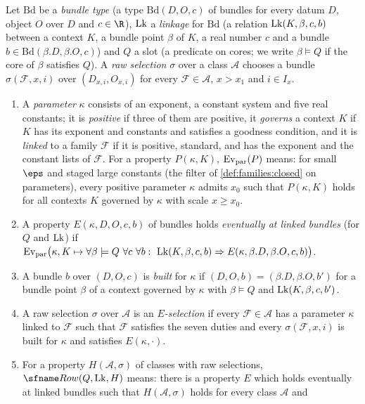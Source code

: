 \begin{definition}[Rows]\label{pf:rows:defrow}
Let $\mathrm{Bd}$ be a \emph{bundle type} (a type $\mathrm{Bd}(D,O,c)$ of bundles for every datum $D$, object $O$ over
$D$ and $c\in\R$), $\mathrm{Lk}$ a \emph{linkage} for $\mathrm{Bd}$ (a relation $\mathrm{Lk}(K,\beta,c,b)$ between a context $K$,
a bundle point $\beta$ of $K$, a real number $c$ and a bundle $b\in\mathrm{Bd}(\beta.D,\beta.O,c)$) and $Q$ a slot
(a predicate on cores; we write $\beta\models Q$ if the core of $\beta$ satisfies $Q$). A \emph{raw selection}
$\sigma$ over a class $\mathcal A$ chooses a bundle $\sigma(\mathcal F,x,i)$ over $(D_{x,i},O_{x,i})$ for every
$\mathcal F\in\mathcal A$, $x>x_1$ and $i\in I_x$.
\begin{enumerate}[label=(\alph*)]
\item A \emph{parameter} $\kappa$ consists of an exponent, a constant system and five real constants; it is
\emph{positive} if three of them are positive, it \emph{governs} a context $K$ if $K$ has its exponent and constants
and satisfies a goodness condition, and it is \emph{linked} to a family $\mathcal F$ if it is positive, standard, and
has the exponent and the constant lists of $\mathcal F$. For a property $P(\kappa,K)$, $\mathrm{Ev}_{\mathrm{par}}(P)$ means: for small
$\eps$ and staged large constants (the filter of \cref{def:families:closed} on parameters), every positive parameter
$\kappa$ admits $x_0$ such that $P(\kappa,K)$ holds for all contexts $K$ governed by $\kappa$ with scale $x\ge x_0$.
\item A property $E(\kappa,D,O,c,b)$ of bundles holds \emph{eventually at linked bundles} (for $Q$ and $\mathrm{Lk}$) if
$\mathrm{Ev}_{\mathrm{par}}\bigl(\kappa,K\mapsto \forall\beta\models Q\ \forall c\ \forall b:\ \mathrm{Lk}(K,\beta,c,b)\Rightarrow
E(\kappa,\beta.D,\beta.O,c,b)\bigr)$.
\item A bundle $b$ over $(D,O,c)$ is \emph{built} for $\kappa$ if $(D,O,b)=(\beta.D,\beta.O,b')$ for a bundle point $\beta$
of a context governed by $\kappa$ with $\beta\models Q$ and $\mathrm{Lk}(K,\beta,c,b')$.
\item A raw selection $\sigma$ over $\mathcal A$ is an \emph{$E$-selection} if every $\mathcal F\in\mathcal A$ has a parameter
$\kappa$ linked to $\mathcal F$ such that $\mathcal F$ satisfies the seven duties and every $\sigma(\mathcal F,x,i)$ is built for
$\kappa$ and satisfies $E(\kappa,\cdot)$.
\item For a property $H(\mathcal A,\sigma)$ of classes with raw selections, $\rowsRow(Q,\rowsLk,H)$ means: there is a
property $E$ which holds eventually at linked bundles such that $H(\mathcal A,\sigma)$ holds for every class $\mathcal A$ and

\end{enumerate}
\end{definition}
